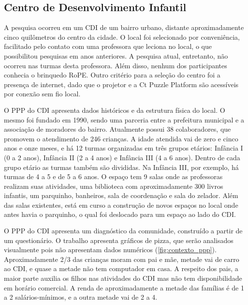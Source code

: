 \subsection{Centro de Desenvolvimento Infantil}
\label{sec:cdi}
A pesquisa ocorreu em um \ac{CDI} de um bairro urbano, distante aproximadamente cinco quilômetros do centro da cidade. O local foi selecionado por conveniência, facilitado pelo contato com uma professora que leciona no local, o que possibilitou pesquisas em anos anteriores. A pesquisa atual, entretanto, não ocorreu nas turmas desta professora. Além disso, nenhum dos participantes conhecia o brinquedo RoPE. Outro critério para a seleção do centro foi a presença de internet, dado que o projetor e a Ct Puzzle Platform são acessíveis por conexão sem fio local.
 
O \ac{PPP} do \ac{CDI} apresenta dados históricos e da estrutura física do local. O mesmo foi fundado em 1990, sendo uma parceria entre a prefeitura municipal e a associação de moradores do bairro. Atualmente possui 38 colaboradores, que promovem o atendimento de 246 crianças. A idade atendida vai de zero e cinco anos e onze meses, e há 12 turmas organizadas em três grupos etários: Infância I (0 a 2 anos), Infância II (2 a 4 anos) e Infância III (4 a 6 anos). Dentro de cada grupo etário as turmas também são divididas. Na Infância III, por exemplo, há turmas de 4 a 5 e de 5 a 6 anos. O espaço tem 9 salas onde as professoras realizam suas atividades, uma biblioteca com aproximadamente 300 livros infantis, um parquinho, banheiros, sala de coordenação e sala do zelador. Além das salas existentes, está em curso a construção de novos espaços no local onde antes havia o parquinho, o qual foi deslocado para um espaço ao lado do CDI.
 
O \ac{PPP} do \ac{CDI} apresenta um diagnóstico da comunidade, construído a partir de um questionário. O trabalho apresenta gráficos de pizza, que serão analisados visualmente pois não apresentam dados numéricos (\autoref{fig:contexto_ppp}). Aproximadamente 2/3 das crianças moram com pai e mãe, metade vai de carro ao \ac{CDI}, e quase a metade não tem computador em casa. A respeito dos pais, a maior parte auxilia os filhos nas atividades do \ac{CDI} mas não tem disponibilidade em horário comercial. A renda de aproximadamente a metade das famílias é de 1 a 2 salários-mínimos, e a outra metade vai de 2 a 4.
 
